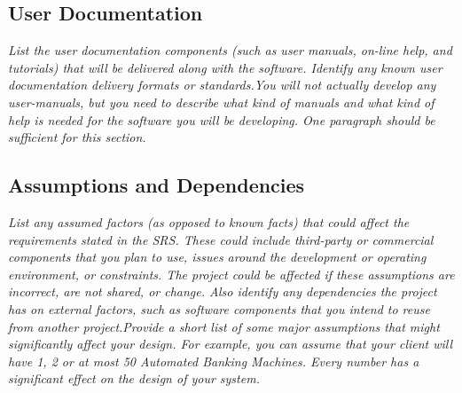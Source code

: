     \subsection{User Documentation}\label{sec:user-documentation}
        \emph{List the user documentation components (such as user manuals, on-line help, and tutorials) that will be delivered along with the software. Identify any known user documentation delivery formats or standards.\gnl You will not actually develop any user-manuals, but you need to describe what kind of manuals and what kind of help is needed for the software you will be developing. One paragraph should be sufficient for this section.}
    \subsection{Assumptions and Dependencies}\label{sec:assumptions-dependencies}
        \emph{List any assumed factors (as opposed to known facts) that could affect the requirements stated in the SRS. These could include third-party or commercial components that you plan to use, issues around the development or operating environment, or constraints. The project could be affected if these assumptions are incorrect, are not shared, or change. Also identify any dependencies the project has on external factors, such as software components that you intend to reuse from another project.\gnl Provide a short list of some major assumptions that might significantly affect your design. For example, you can assume that your client will have 1, 2 or at most 50 Automated Banking Machines. Every number has a significant effect on the design of your system.}
